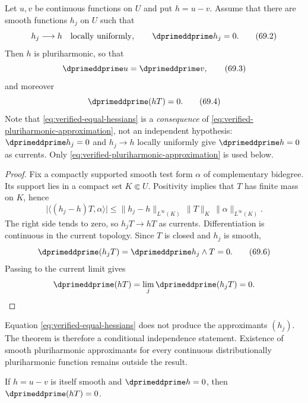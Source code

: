 \begin{theorem}\label{thm:verified-cld-criterion}
Let $u,v$ be continuous functions on $U$ and put $h=u-v$.  Assume
that there are smooth functions $h_j$ on $U$
such that
\[
                h_j\longrightarrow h
          \quad\text{locally uniformly},
       \qquad
                \dprimeddprime h_j=0.
\tag{69.2}\label{eq:verified-pluriharmonic-approximation}
\]
Then $h$ is pluriharmonic, so that
\[
                            \dprimeddprime u=\dprimeddprime v,
\tag{69.3}\label{eq:verified-equal-hessians}
\]
and moreover
\[
                              \dprimeddprime(hT)=0.
\tag{69.4}\label{eq:verified-independence}
\]
Note that \eqref{eq:verified-equal-hessians} is a \emph{consequence} of
\eqref{eq:verified-pluriharmonic-approximation}, not an independent
hypothesis: $\dprimeddprime h_j=0$ and $h_j\to h$ locally uniformly
give $\dprimeddprime h=0$ as currents.  Only
\eqref{eq:verified-pluriharmonic-approximation} is used below.
\end{theorem}

\begin{proof}
Fix a compactly supported smooth test form $\alpha$ of complementary
bidegree. Its support lies in a compact set $K\Subset U$. Positivity
implies that $T$ has finite mass on $K$, hence
\[
 \bigl|\langle(h_j-h)T,\alpha\rangle\bigr|
 \leq
 \|h_j-h\|_{L^\infty(K)}
 \,\|T\|_K\,\|\alpha\|_{L^\infty(K)}.
\tag{69.5}\label{eq:verified-current-uniform}
\]
The right side tends to zero, so $h_jT\to hT$ as currents.
Differentiation is continuous in the current topology. Since $T$ is
closed and $h_j$ is smooth,
\[
 \dprimeddprime(h_jT)
   =\dprimeddprime h_j\wedge T
   =0.
\tag{69.6}\label{eq:verified-smooth-product}
\]
Passing to the current limit gives
\[
 \dprimeddprime(hT)
   =\lim_j \dprimeddprime(h_jT)=0.
\]
\end{proof}

\begin{remark}
\label{rem:verified-cld-sufficient}
Equation \eqref{eq:verified-equal-hessians} does not produce the
approximants $(h_j)$. The theorem is therefore a conditional
independence statement. Existence of smooth pluriharmonic
approximants for every continuous distributionally pluriharmonic
function remains outside the result.
\end{remark}

\begin{corollary}\label{cor:verified-cld-smooth}
If $h=u-v$ is itself smooth and $\dprimeddprime h=0$, then
$\dprimeddprime(hT)=0$.
\end{corollary}

